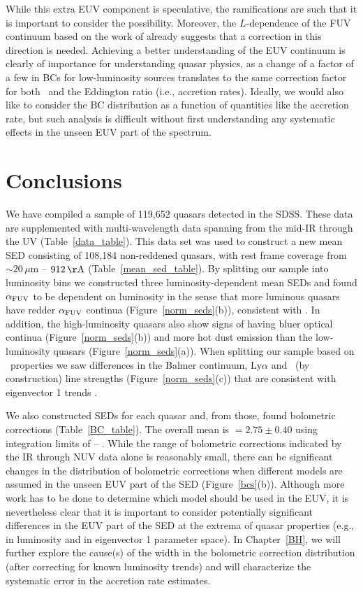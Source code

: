 While this extra EUV component is speculative, the ramifications are such that it is important to consider the possibility.  Moreover, the $L$-dependence of the FUV continuum based on the work of \cite{Scott:2004} already suggests that a correction in this direction is needed.  Achieving a better understanding of the EUV continuum is clearly of importance for understanding quasar physics, as a change of a factor of a few in BCs for low-luminosity sources translates to the same correction factor for both \lbol\ and the Eddington ratio (i.e., accretion rates).  Ideally, we would also like to consider the BC distribution as a function of quantities like the accretion rate, but such analysis is difficult without first understanding any systematic effects in the unseen EUV part of the spectrum.

\section{Conclusions} \label{conclusions}

We have compiled a sample of 119,652 quasars detected in the SDSS.  These data are supplemented with multi-wavelength data spanning from the mid-IR through the UV (Table~\ref{data_table}).  This data set was used to construct a new mean SED consisting of 108,184 non-reddened quasars, with rest frame coverage from $\sim 20\, \mu$m -- $912\,{\rm \AA}$ (Table~\ref{mean_sed_table}). 
By splitting our sample into luminosity bins we constructed three luminosity-dependent mean SEDs and found $\alpha_{{\rm FUV}}$ to be dependent on luminosity in the sense that more luminous quasars have redder $\alpha_{{\rm FUV}}$ continua (Figure~\ref{norm_seds}(b)), 
consistent with \citet{Scott:2004}. In addition, the high-luminosity quasars also show signs of having bluer optical continua (Figure~\ref{norm_seds}(b)) and more hot dust emission than the low-luminosity quasars (Figure~\ref{norm_seds}(a)).  
When splitting our sample based on \civ\ properties we saw differences in the Balmer continuum, Ly$\alpha$ and \civ\ (by construction) line strengths (Figure~\ref{norm_seds}(c)) that are consistent with eigenvector 1 trends \citep{Brotherton:1999}.

We also constructed SEDs for each quasar and, from those, found bolometric corrections (Table~\ref{BC_table}).  The overall mean is \bctwofive $=2.75 \pm 0.40$ using integration limits of \onemum-- \twokev. 
While the range of bolometric corrections indicated by the IR through NUV data alone is reasonably small, there can be significant changes in the distribution of bolometric corrections when different models are assumed in the unseen EUV part of the SED (Figure~\ref{bcs}(b)).  Although more work has to be done to determine which model should be used in the EUV, it is nevertheless clear that it is important to consider potentially significant differences in the EUV part of the SED at the extrema of quasar properties (e.g., in luminosity and in eigenvector 1 parameter space).
In Chapter~\ref{BH}, we will further explore the cause(s) of the width in the bolometric correction distribution (after correcting for known luminosity trends) and will characterize the systematic error in the accretion rate estimates.

